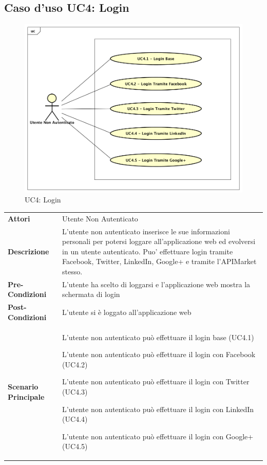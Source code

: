 \newpage
\subsection{Caso d'uso UC4:  Login}
\label{UC4}
\begin{figure}[ht]
	\centering
	\includegraphics[scale=0.45]{UML/UC4.png}
	\caption{UC4: Login}
\end{figure}

\begin{longtable}{ l | p{11cm}}
	\hline
	\rowcolor{Gray}
	 \multicolumn{2}{c}{UC4 - Login}\\
	 \hline
	\textbf{Attori} & Utente Non Autenticato \\
	\textbf{Descrizione} & L'utente non autenticato inserisce le sue informazioni personali per potersi loggare all'applicazione web ed evolversi in un utente autenticato. Puo' effettuare login tramite Facebook, Twitter, LinkedIn, Google+ e tramite l'APIMarket stesso. \\
	\textbf{Pre-Condizioni} & L'utente ha scelto di loggarsi e l'applicazione web mostra la schermata di login \\
	\textbf{Post-Condizioni} & L'utente si è loggato all'applicazione web \\
	\textbf{Scenario Principale} & \begin{enumerate*}[label=(\arabic*.),itemjoin={\newline}]
		\item L'utente non autenticato può effettuare il login base (UC4.1)
		\item L'utente non autenticato può effettuare il login con Facebook (UC4.2)
		\item L'utente non autenticato può effettuare il login con Twitter (UC4.3)
		\item L'utente non autenticato può effettuare il login con LinkedIn (UC4.4)
		\item L'utente non autenticato può effettuare il login con Google+ (UC4.5)
	\end{enumerate*}\\
\end{longtable}